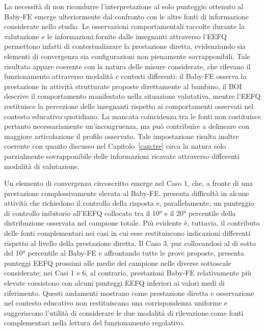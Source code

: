 La necessità di non ricondurre l'interpretazione al solo punteggio ottenuto al Baby-FE emerge ulteriormente dal confronto con le altre fonti di informazione considerate nello studio. Le osservazioni comportamentali raccolte durante la valutazione e le informazioni fornite dalle insegnanti attraverso l'EEFQ permettono infatti di contestualizzare la prestazione diretta, evidenziando sia elementi di convergenza sia configurazioni non pienamente sovrapponibili. Tale risultato appare coerente con la natura delle misure considerate, che rilevano il funzionamento attraverso modalità e contesti differenti: il Baby-FE osserva la prestazione in attività strutturate proposte direttamente al bambino, il BOI descrive il comportamento manifestato nella situazione valutativa, mentre l'EEFQ restituisce la percezione delle insegnanti rispetto ai comportamenti osservati nel contesto educativo quotidiano. La mancata coincidenza tra le fonti non costituisce pertanto necessariamente un'incongruenza, ma può contribuire a delineare con maggiore articolazione il profilo osservato. Tale impostazione risulta inoltre coerente con quanto discusso nel Capitolo~\ref{cap:tre} circa la natura solo parzialmente sovrapponibile delle informazioni ricavate attraverso differenti modalità di valutazione.

Un elemento di convergenza circoscritto emerge nel Caso 1, che, a fronte di una prestazione complessivamente elevata al Baby-FE, presenta difficoltà in alcune attività che richiedono il controllo della risposta e, parallelamente, un punteggio di controllo inibitorio all'EEFQ collocato tra il 10° e il 20° percentile della distribuzione osservata nel campione totale. Più evidente è, tuttavia, il contributo delle fonti complementari nei casi in cui esse restituiscono indicazioni differenti rispetto al livello della prestazione diretta. Il Caso 3, pur collocandosi al di sotto del 10° percentile al Baby-FE e affrontando tutte le prove proposte, presenta punteggi EEFQ prossimi alle medie del campione nelle diverse sottoscale considerate; nei Casi 1 e 6, al contrario, prestazioni Baby-FE relativamente più elevate coesistono con alcuni punteggi EEFQ inferiori ai valori medi di riferimento. Questi andamenti mostrano come prestazione diretta e osservazione nel contesto educativo non restituiscano una corrispondenza uniforme e suggeriscono l'utilità di considerare le due modalità di rilevazione come fonti complementari nella lettura del funzionamento regolativo.


